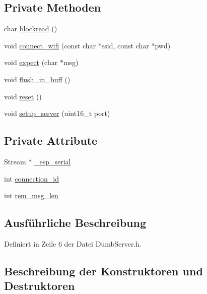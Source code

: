\subsection*{Private Methoden}
\begin{DoxyCompactItemize}
\item 
char \hyperlink{classEspServer_ac2b4ae3c7ebcd751c4c8020412fa3270}{blockread} ()
\item 
void \hyperlink{classEspServer_a504393c8aa6394b2d0631146425bf011}{connect\+\_\+wifi} (const char $\ast$ssid, const char $\ast$pwd)
\item 
void \hyperlink{classEspServer_aff5ea67ab96af075223b2b836036ccf1}{expect} (char $\ast$msg)
\item 
void \hyperlink{classEspServer_a1d791edc8eca304acc71f702f07c0437}{flush\+\_\+in\+\_\+buff} ()
\item 
void \hyperlink{classEspServer_ad20897c5c8bd47f5d4005989bead0e55}{reset} ()
\item 
void \hyperlink{classEspServer_a7968cc44a6c9fff24b9020e1714c49f8}{setup\+\_\+server} (uint16\+\_\+t port)
\end{DoxyCompactItemize}
\subsection*{Private Attribute}
\begin{DoxyCompactItemize}
\item 
Stream $\ast$ \hyperlink{classEspServer_a552aab874ad99b696f4c997d6f5a4746}{\+\_\+esp\+\_\+serial}
\item 
int \hyperlink{classEspServer_a821bd4e05f0b260cc584a2d23bda0fff}{connection\+\_\+id}
\item 
int \hyperlink{classEspServer_a34a62d83c82a13f441af983f9b212e25}{rem\+\_\+msg\+\_\+len}
\end{DoxyCompactItemize}


\subsection{Ausführliche Beschreibung}


Definiert in Zeile 6 der Datei Dumb\+Server.\+h.



\subsection{Beschreibung der Konstruktoren und Destruktoren}
\mbox{\label{classEspServer_aa852bdd3db81410e2b71cafa8adb5c79}} 
